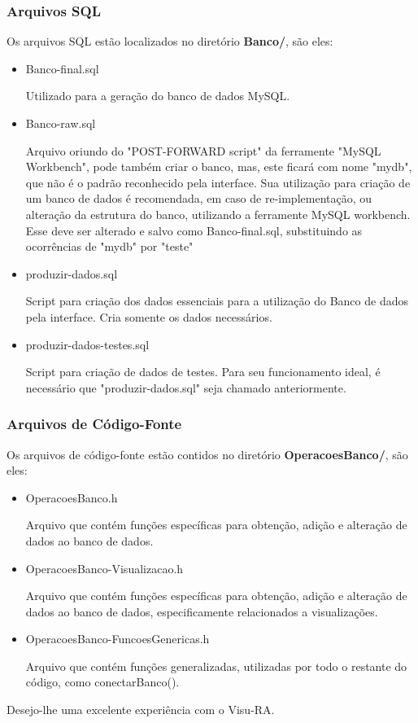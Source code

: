 \documentclass[onecolumn,12pt]{article}
\begin{document}
    		\subsubsection{Arquivos SQL}
    			Os arquivos SQL estão localizados no diretório \textbf{Banco/}, são eles:
    			\begin{itemize}
    				\item Banco-final.sql\par
    					Utilizado para a geração do banco de dados MySQL.
    				\item Banco-raw.sql\par
    					Arquivo oriundo do "POST-FORWARD script" da ferramente "MySQL Workbench", pode também criar o banco, mas, este ficará com nome "mydb", que não é o padrão reconhecido pela interface. Sua utilização para criação de um banco de dados é recomendada, em caso de re-implementação, ou alteração da estrutura do banco, utilizando a ferramente MySQL workbench. Esse deve ser alterado e salvo como Banco-final.sql, substituindo as ocorrências de "mydb" por "teste"
    				\item produzir-dados.sql\par
    					Script para criação dos dados essenciais para a utilização do Banco de dados pela interface. Cria somente os dados necessários.
    				\item produzir-dados-testes.sql\par
    					Script para criação de dados de testes. Para seu funcionamento ideal, é necessário que "produzir-dados.sql" seja chamado anteriormente.
    			\end{itemize}
    		\subsubsection{Arquivos de Código-Fonte}
    			Os arquivos de código-fonte estão contidos no diretório \textbf{OperacoesBanco/}, são eles:
    			\begin{itemize}
    				\item OperacoesBanco.h\par
    					Arquivo que contém funções específicas para obtenção, adição e alteração de dados ao banco de dados.
    				\item OperacoesBanco-Visualizacao.h\par
    					Arquivo que contém funções específicas para obtenção, adição e alteração de dados ao banco de dados, especificamente relacionados a visualizações.
    				\item OperacoesBanco-FuncoesGenericas.h\par
    					Arquivo que contém funções generalizadas, utilizadas por todo o restante do código, como conectarBanco().
    			\end{itemize}
    	

    \newpage
    \begin{large}
    	Desejo-lhe uma excelente experiência com o Visu-RA.
    \end{large}
\end{document}
